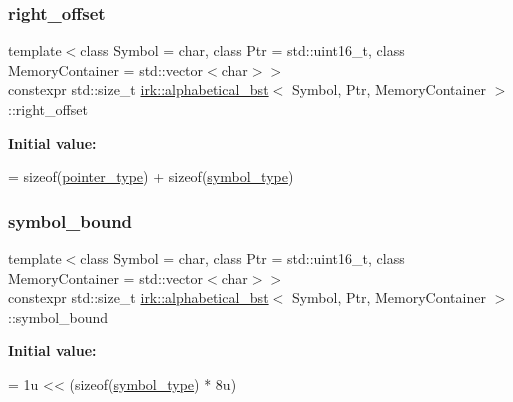 \subsubsection{\texorpdfstring{right\+\_\+offset}{right\_offset}}
{\footnotesize\ttfamily template$<$class Symbol = char, class Ptr = std\+::uint16\+\_\+t, class Memory\+Container = std\+::vector$<$char$>$$>$ \\
constexpr std\+::size\+\_\+t \mbox{\hyperlink{classirk_1_1alphabetical__bst}{irk\+::alphabetical\+\_\+bst}}$<$ Symbol, Ptr, Memory\+Container $>$\+::right\+\_\+offset\hspace{0.3cm}{\ttfamily [static]}}

{\bfseries Initial value\+:}
\begin{DoxyCode}
=
        \textcolor{keyword}{sizeof}(\mbox{\hyperlink{classirk_1_1alphabetical__bst_ae689c05ab96a71769e24908d5c73765c}{pointer\_type}}) + \textcolor{keyword}{sizeof}(\mbox{\hyperlink{classirk_1_1alphabetical__bst_a296ccb8fa9fa9dce3b3c3beab0a5ca28}{symbol\_type}})
\end{DoxyCode}
\mbox{\label{classirk_1_1alphabetical__bst_aab79d45f120c441ecfe435a15f060553}} 
\subsubsection{\texorpdfstring{symbol\+\_\+bound}{symbol\_bound}}
{\footnotesize\ttfamily template$<$class Symbol = char, class Ptr = std\+::uint16\+\_\+t, class Memory\+Container = std\+::vector$<$char$>$$>$ \\
constexpr std\+::size\+\_\+t \mbox{\hyperlink{classirk_1_1alphabetical__bst}{irk\+::alphabetical\+\_\+bst}}$<$ Symbol, Ptr, Memory\+Container $>$\+::symbol\+\_\+bound\hspace{0.3cm}{\ttfamily [static]}}

{\bfseries Initial value\+:}
\begin{DoxyCode}
= 1u
        << (\textcolor{keyword}{sizeof}(\mbox{\hyperlink{classirk_1_1alphabetical__bst_a296ccb8fa9fa9dce3b3c3beab0a5ca28}{symbol\_type}}) * 8u)
\end{DoxyCode}
\mbox{\label{classirk_1_1alphabetical__bst_aeed9426027198ce7abe963119de8191d}} 
